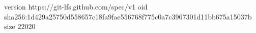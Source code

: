 version https://git-lfs.github.com/spec/v1
oid sha256:1d429a25750d558657c18fa9fae556768f775c0a7c3967301d11bb675a15037b
size 22020
